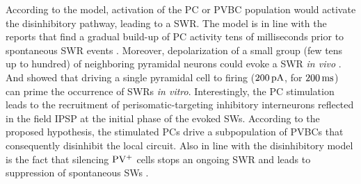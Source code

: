     According to the model, activation of the PC or PVBC population would
    activate the disinhibitory pathway, leading to a SWR. The model is in line
    with the reports that find a gradual build-up of PC activity tens of
    milliseconds prior to spontaneous SWR events \citep{Ellender2010,
    Schlingloff2014, Hulse2016}. Moreover, depolarization of a small group (few
    tens up to hundred) of neighboring pyramidal neurons could evoke a SWR
    \textit{in vivo} \citep{Stark2014}. And \cite{Bazelot2016} showed that
    driving a single pyramidal cell to firing ($200\, \rm pA$, for $200\, \rm
    ms$) can prime the occurrence of SWRs \textit{in vitro}. Interestingly, the
    PC stimulation leads to the recruitment of perisomatic-targeting inhibitory
    interneurons reflected in the field IPSP at the initial phase of the evoked
    SWs. According to the proposed hypothesis, the stimulated PCs
    \citep{Stark2014, Bazelot2016} drive a subpopulation of PVBCs that
    consequently disinhibit the local circuit. Also in line with the
    disinhibitory model is the fact that silencing $\rm PV^+$ cells stops an
    ongoing SWR and leads to suppression of spontaneous SWs
    \citep{Schlingloff2014}.


